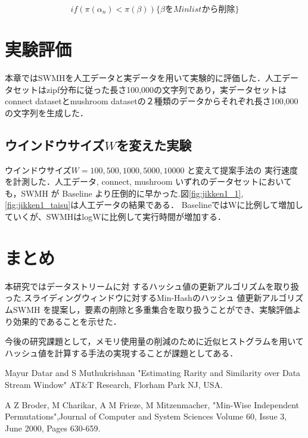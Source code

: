 \documentclass[a4j,twocolumn,dvipdfmx,autodetect-engine]{jsarticle}
\begin{document}
\begin{equation}
if (\pi(\alpha_n)<\pi(\beta))\{
\beta をMinlistから削除
\}
\end{equation}



\section{実験評価}
本章ではSWMHを人工データと実データを用いて実験的に評価した．人工データセットはzipf分布に従った長さ100,000の文字列であり，実データセットはconnect datasetとmushroom datasetの２種類のデータからそれぞれ長さ100,000の文字列を生成した．

\subsection{ウインドウサイズ$W$を変えた実験}
ウインドウサイズ$ W = 100, 500, 1000, 5000, 10000$ と変えて提案手法の 実行速度を計測した．人工データ, connect, mushroom いずれのデータセットにおいても，SWMH が Baseline より圧倒的に早かった.図\ref{fig:jikken1_1}, \ref{fig:jikken1_taisu}は人工データの結果である．
BaselineではWに比例して増加していくが、SWMHはlogWに比例して実行時間が増加する．

\section{まとめ}
本研究ではデータストリームに対 するハッシュ値の更新アルゴリズムを取り扱った.スライディングウィンドウに対するMin-Hashのハッシュ 値更新アルゴリズムSWMH を提案し，要素の削除と多重集合を取り扱うことができ、実験評価より効果的であることを示せた．

今後の研究課題として，メモリ使用量の削減のために近似ヒストグラムを用いてハッシュ値を計算する手法の実現することが課題としてある．


\begin{thebibliography}{99}
 Mayur Datar and S Muthukrishnan "Estimating Rarity and Similarity over Data Stream Window" AT\&T Research, Florham Park NJ, USA.
 
A Z Broder, M Charikar, A M Frieze, M Mitzenmacher, "Min-Wise Independent Permutations",Journal of Computer and System Sciences Volume 60, Issue 3, June 2000, Pages 630-659.

\end{thebibliography}
\end{document}
